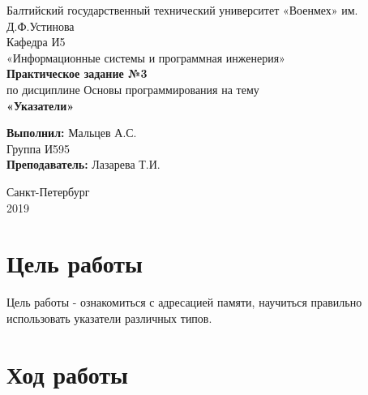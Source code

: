 \documentclass[a4paper,14pt]{extarticle}
\begin{document}
\begin{titlepage}
\centering
\small Балтийский государственный технический университет «Военмех» им. Д.Ф.Устинова \\
\vspace{3cm}
\normalsize Кафедра И5\\
«Информационные системы и программная инженерия»\\
\vspace{3cm}
\textbf{Практическое задание №3}\\
по дисциплине Основы программирования на тему\\ 
\textbf{«Указатели»}\\
\vfill

\begin{flushleft}
\textbf{Выполнил:}
\hfill {Мальцев А.С.} \\
\hfill {Группа И595} \\
\vspace{1cm}
\textbf{Преподаватель:}
\hfill {Лазарева Т.И.} \\
\end{flushleft}
\vspace{3cm}

{\centering Санкт-Петербург \\ 
\vspace{0.15cm}
2019}
\end{titlepage}

\section{Цель работы}
Цель работы - ознакомиться с адресацией памяти, научиться правильно использовать указатели различных типов.

\section{Ход работы}
\end{document}
